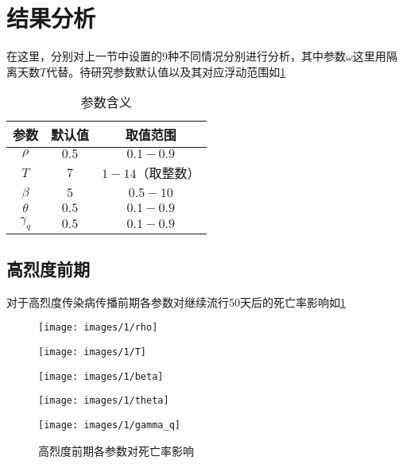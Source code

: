 \documentclass[withoutpreface,bwprint]{cumcmthesis}
\begin{document}
\section{结果分析}
在这里，分别对上一节中设置的9种不同情况分别进行分析，其中参数$\omega$这里用隔离天数$T$代替。待研究参数默认值以及其对应浮动范围如\cref{tb:2}
\begin{table}[H]
    \caption{参数含义}\label{tb:2}
    \centering
    \begin{tabular}{ccc}
        \toprule[1.5pt]
        参数         & 默认值 & 取值范围      \\
        \midrule[1pt]
        $\rho$     & $0.5$ & $0.1-0.9$   \\
        $T$        & $7$   & $1-14$（取整数） \\
        $\beta$    & $5$   & $0.5-10$    \\
        $\theta$   & $0.5$ & $0.1-0.9$   \\
        $\gamma_q$ & $0.5$ & $0.1-0.9$   \\
        \bottomrule[1.5pt]
    \end{tabular}
\end{table}

\subsection{高烈度前期}

对于高烈度传染病传播前期各参数对继续流行50天后的死亡率影响如\cref{fig:6}
\begin{figure}[H]
    \centering
    \begin{minipage}[c]{0.3\textwidth}
        \centering
        \texttt{[image: images/1/rho]}
        \subcaption{$\rho$}
    \end{minipage}
    \begin{minipage}[c]{0.3\textwidth}
        \centering
        \texttt{[image: images/1/T]}
    \end{minipage}
    \begin{minipage}[c]{0.3\textwidth}
        \centering
        \texttt{[image: images/1/beta]}
        \subcaption{$\beta$}
    \end{minipage}

    \begin{minipage}[c]{0.3\textwidth}
        \centering
        \texttt{[image: images/1/theta]}
        \subcaption{$\theta$}
    \end{minipage}
    \begin{minipage}[c]{0.3\textwidth}
        \centering
        \texttt{[image: images/1/gamma\_q]}
    \end{minipage}
    \caption{高烈度前期各参数对死亡率影响}
    \label{fig:6}
    
\end{figure}
\end{document}
